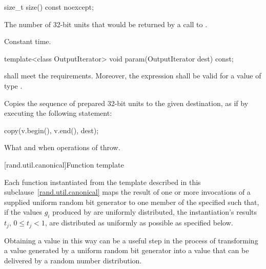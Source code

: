 %
\begin{itemdecl}
size_t size() const noexcept;
\end{itemdecl}

\begin{itemdescr}
\pnum\returns The number of 32-bit units
 that would be returned
 by a call to .

\pnum\complexity Constant time.
\end{itemdescr}

%
\begin{itemdecl}
template<class OutputIterator>
  void param(OutputIterator dest) const;
\end{itemdecl}

\begin{itemdescr}
\pnum\requires
   shall meet the
   requirements.
  Moreover,
  the expression
  shall be valid for a value  of type .

\pnum\effects Copies the sequence of prepared 32-bit units
 to the given destination,
 as if by executing the following statement:
\begin{codeblock}
copy(v.begin(), v.end(), dest);
\end{codeblock}

\pnum\throws
What and when  operations of  throw.
\end{itemdescr}


[rand.util.canonical]{Function template }%
%

\pnum
 Each function instantiated
 from the template
 described in this subclause~\ref{rand.util.canonical}
 maps the result of one or more invocations
 of a supplied uniform random bit generator 
 to one member
 of the specified 
 such that,
 if the values $g_i$
 produced by 
 are uniformly distributed,
 the instantiation's results
 $t_j$, $0 \leq t_j < 1$,
 are distributed as uniformly as possible
 as specified below.

\pnum
\begin{note}
 Obtaining a value in this way
 can be a useful step
 in the process of transforming
 a value generated by a uniform random bit generator
 into a value
 that can be delivered by a random number distribution.
\end{note}

